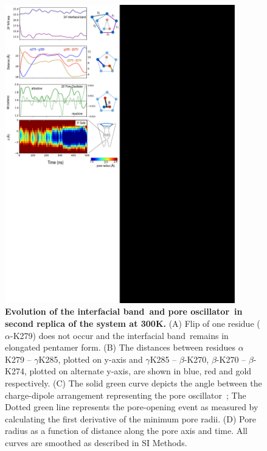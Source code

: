 \documentclass[9pt,onecolumn,oneside,lineno]{pnas-new}
\newcommand{\fivering}{interfacial band~}
\newcommand{\triad}{pore oscillator~}
\begin{document}
\begin{figure}
\begin{center}
\includegraphics[width = 100mm]{figures_2/pore_opening_events_K300_2.pdf}
\end{center}
\caption{{\bf Evolution of the \fivering and \triad in second replica of the \WT system at 300K.} (A) Flip of one residue ($\alpha$-K279)  does not occur and the \fivering remains in elongated pentamer form. (B) The distances between residues $\alpha$K279 -- $\gamma$K285, plotted on y-axis and  $\gamma$K285 -- $\beta$-K270, $\beta$-K270 -- $\beta$-K274, plotted on alternate y-axis, are shown in blue, red and gold respectively. (C) The solid green curve depicts the angle between the charge-dipole arrangement representing the \triad; The Dotted green line represents the pore-opening event as measured by calculating the  first derivative of the minimum pore radii. (D) Pore radius as a function of distance along the pore axis and time.  All curves are smoothed as described in SI Methods.}
\label{fig:K300_2}
\end{figure}
\end{document}
